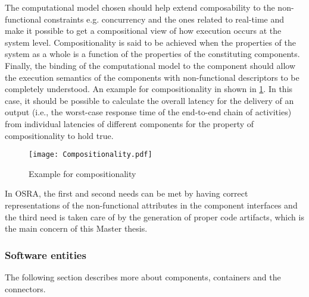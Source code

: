 \begin{description}
The computational model chosen should help extend composability to the non-functional constraints e.g. concurrency and the ones related to real-time and make it possible to get a compositional view of how execution occurs at the system level. Compositionality is said to be achieved when the properties of the system as a whole is a function of the properties of the constituting components. Finally, the binding of the computational model to the component should allow the execution semantics of the components with non-functional descriptors to be completely understood. An example for compositionality in shown in \cref{fig: Compositionality}. In this case, it should be possible to calculate the overall latency for the delivery of an output (i.e., the worst-case response time of the end-to-end chain of activities) from individual latencies of different components for the property of compositionality to hold true.

\begin{figure}[h]
	\centering
	\texttt{[image: Compositionality.pdf]}
	\caption{Example for compositionality}
	\label{fig: Compositionality}
\end{figure} 

In OSRA, the first and second needs can be met by having correct representations of the non-functional attributes in the component interfaces and the third need is taken care of by the generation of proper code artifacts, which is the main concern of this Master thesis.     
\end{description}

\subsubsection{\textbf{Software entities}}
\label {section: Software entities}
The following section describes more about components, containers and the connectors.

